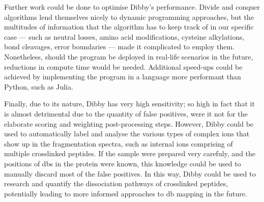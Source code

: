 Further work could be done to optimise Dibby's performance. Divide and conquer algorithms lend themselves nicely to dynamic programming approaches, but the multitudes of information that the algorithm has to keep track of in our specific case --- such as neutral losses, amino acid modifications, cysteine alkylations, bond cleavages, error boundaries --- made it complicated to employ them. Nonetheless, should the program be deployed in real-life scenarios in the future, reductions in compute time would be needed. Additional speed-ups could be achieved by implementing the program in a language more performant than Python, such as Julia.

Finally, due to its nature, Dibby has very high sensitivity; so high in fact that it is almost detrimental due to the quantity of false positives, were it not for the elaborate scoring and weighting post-processing steps. However, Dibby could be used to automatically label and analyse the various types of complex ions that show up in the fragmentation spectra, such as internal ions comprising of multiple crosslinked peptides. If the sample were prepared very carefuly, and the positions of \glspl*{db} in the protein were known, this knowledge could be used to manually discard most of the false positives. In this way, Dibby could be used to research and quantify the dissociation pathways of crosslinked peptides, potentially leading to more informed approaches to \gls*{db} mapping in the future.